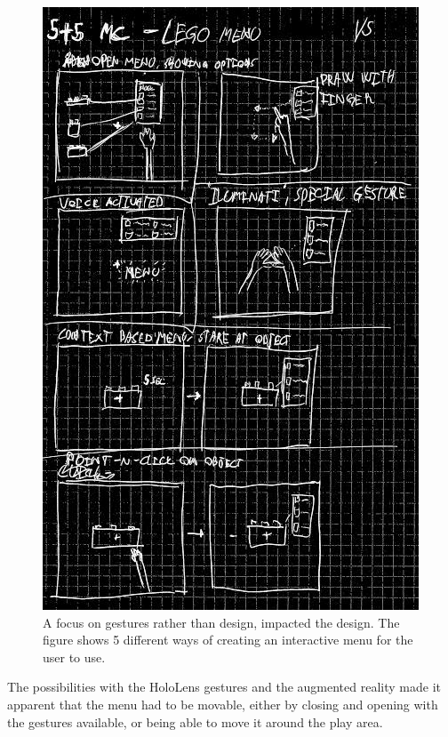 \begin{figure}[h]
	\centering
	\includegraphics[width=0.7\linewidth]{figures/Menu/menu5}
	\caption{A focus on gestures rather than design, impacted the design. The figure shows 5 different ways of creating an interactive menu for the user to use.}
	\label{fig:menugesture}
\end{figure}
\par
The possibilities with the HoloLens gestures and the augmented reality made it apparent that the menu had to be movable, either by closing and opening with the gestures available, or being able to move it around the play area. 

